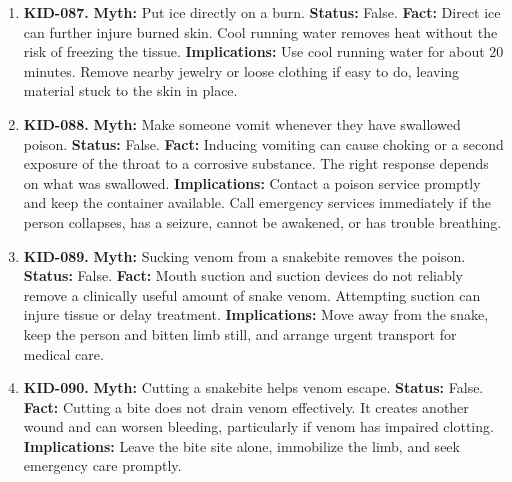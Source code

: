 \documentclass[11pt,oneside]{book}
\begin{document}
\begin{enumerate}[leftmargin=0pt,labelwidth=0pt,labelsep=0pt,itemindent=0pt]
\textbf{Implications:} Cool the burned area promptly under cool running water for about 20 minutes while keeping the rest of the person warm. Seek urgent care for deep, extensive, or serious burns.
\item[] \textbf{KID-087.} \textbf{Myth:} Put ice directly on a burn.\newline
\textbf{Status:} False.\newline
\textbf{Fact:} Direct ice can further injure burned skin. Cool running water removes heat without the risk of freezing the tissue. \cite{ref370}\newline
\textbf{Implications:} Use cool running water for about 20 minutes. Remove nearby jewelry or loose clothing if easy to do, leaving material stuck to the skin in place.
\item[] \textbf{KID-088.} \textbf{Myth:} Make someone vomit whenever they have swallowed poison.\newline
\textbf{Status:} False.\newline
\textbf{Fact:} Inducing vomiting can cause choking or a second exposure of the throat to a corrosive substance. The right response depends on what was swallowed. \cite{ref180}\newline
\textbf{Implications:} Contact a poison service promptly and keep the container available. Call emergency services immediately if the person collapses, has a seizure, cannot be awakened, or has trouble breathing.
\item[] \textbf{KID-089.} \textbf{Myth:} Sucking venom from a snakebite removes the poison.\newline
\textbf{Status:} False.\newline
\textbf{Fact:} Mouth suction and suction devices do not reliably remove a clinically useful amount of snake venom. Attempting suction can injure tissue or delay treatment. \cite{ref269,ref371}\newline
\textbf{Implications:} Move away from the snake, keep the person and bitten limb still, and arrange urgent transport for medical care.
\item[] \textbf{KID-090.} \textbf{Myth:} Cutting a snakebite helps venom escape.\newline
\textbf{Status:} False.\newline
\textbf{Fact:} Cutting a bite does not drain venom effectively. It creates another wound and can worsen bleeding, particularly if venom has impaired clotting. \cite{ref269,ref371}\newline
\textbf{Implications:} Leave the bite site alone, immobilize the limb, and seek emergency care promptly.

\end{enumerate}
\end{document}
